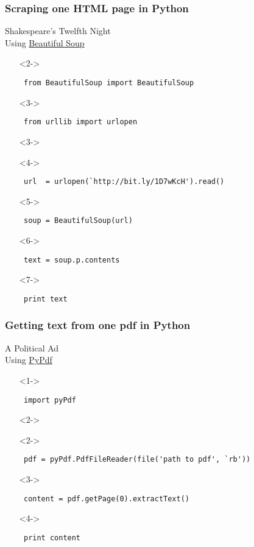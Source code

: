 \documentclass[compress, black]{beamer}
\begin{document}
\begin{frame}[fragile]
\frametitle{Scraping one HTML page in Python} 

Shakespeare's Twelfth Night\\
Using \href{http://www.crummy.com/software/BeautifulSoup/}{Beautiful Soup}
\small
	\begin{enumerate}
		\item[]<2->\begin{verbatim} from BeautifulSoup import BeautifulSoup \end{verbatim}
		\item[]<3->\begin{verbatim} from urllib import urlopen \end{verbatim}
		\item[]<3->
		\item[]<4->\begin{verbatim} url  = urlopen(`http://bit.ly/1D7wKcH').read()\end{verbatim}
		\item[]<5->\begin{verbatim} soup = BeautifulSoup(url)\end{verbatim}
		\item[]<6->\begin{verbatim} text = soup.p.contents\end{verbatim}
		\item[]<7->\begin{verbatim} print text\end{verbatim}
	\end{enumerate}
\end{frame}

\begin{frame}[fragile]
\frametitle{Getting text from one pdf in Python} 

A Political Ad\\
Using \href{http://pybrary.net/pyPdf/}{PyPdf}
\small
	\begin{enumerate}
		\item[]<1->\begin{verbatim} import pyPdf \end{verbatim}
		\item[]<2->
		\item[]<2->\begin{verbatim} pdf = pyPdf.PdfFileReader(file('path to pdf', `rb'))\end{verbatim}
		\item[]<3->\begin{verbatim} content = pdf.getPage(0).extractText()\end{verbatim}
		\item[]<4->\begin{verbatim} print content\end{verbatim}
	\end{enumerate}
\end{frame}
\end{document}
